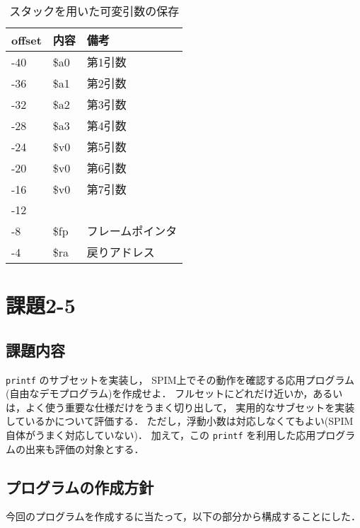 \documentclass[a4j,11pt]{jarticle}
\begin{document}
\begin{table}[]
      \centering
      \caption{スタックを用いた可変引数の保存}
      \label{tbl:2-4}
      \begin{tabular}{|l|l|l|}
      \hline
      offset & 内容   & 備考   \\ \hline
      -40    & \$a0 & 第1引数 \\ \hline
      -36    & \$a1 & 第2引数 \\ \hline
      -32    & \$a2 & 第3引数 \\ \hline
      -28    & \$a3 & 第4引数 \\ \hline
      -24    & \$v0 & 第5引数 \\ \hline
      -20    & \$v0 & 第6引数 \\ \hline
      -16    & \$v0 & 第7引数 \\ \hline
      -12    &      &      \\ \hline
      -8     & \$fp & フレームポインタ \\ \hline
      -4     & \$ra & 戻りアドレス \\ \hline
      \end{tabular}
      \end{table}

\section{課題2-5}

\subsection{課題内容}

{\tt printf} のサブセットを実装し， SPIM上でその動作を確認する応用プログラム(自由なデモプログラム)を作成せよ． 
フルセットにどれだけ近いか，あるいは，よく使う重要な仕様だけをうまく切り出して， 
実用的なサブセットを実装しているかについて評価する． 
ただし，浮動小数は対応しなくてもよい(SPIM自体がうまく対応していない)． 
加えて，この {\tt printf} を利用した応用プログラムの出来も評価の対象とする．


\subsection{プログラムの作成方針}
今回のプログラムを作成するに当たって，以下の部分から構成することにした．
\end{document}
